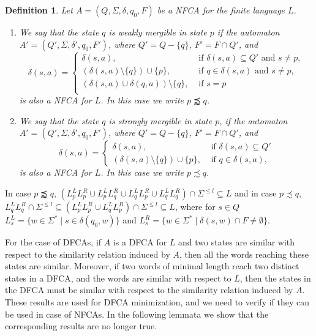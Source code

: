 \documentclass[submission,copyright,creativecommons]{eptcs}
\newtheorem{definition}{Definition}
\begin{document}
\begin{definition}
 Let $A=(Q,\Sigma,\delta,q_0,F)$ be a NFCA for the finite language $L$. 
\begin{enumerate}
 \item We say that the state $q$ is {\em weakly mergible} in state $p$
if the automaton
$A'=(Q',\Sigma,\delta',q_0,F')$, where
$Q'=Q-\{q\}$, $F'=F\cap Q'$, and 
$$
\delta(s,a)=\left\{\begin{array}{ll}
                      \delta(s,a),&\mbox{ if  }\delta(s,a)\subseteq Q'\mbox{ and }s\neq p,\\
                      (\delta(s,a)\setminus\{q\})\cup \{p\},&\mbox{ if  }q\in \delta(s,a)\mbox{ and }s\neq p,\\
                       (\delta(s,a)\cup\delta(q,a))\setminus\{q\},&\mbox{ if  }s=p\\
                     \end{array}
\right.
$$
 is also a NFCA for $L$.
In this case we write $p\precapprox q$.
\item We say that the state $q$ is {\em strongly mergible} in state $p$, 
if the automaton
$A'=(Q',\Sigma,\delta',q_0,F')$, where
$Q'=Q-\{q\}$, $F'=F\cap Q'$, and 
$$
\delta(s,a)=\left\{\begin{array}{ll}
                      \delta(s,a),&\mbox{ if  }\delta(s,a)\subseteq Q'\\
                      (\delta(s,a)\setminus\{q\})\cup \{p\},&\mbox{ if  }q\in \delta(s,a),
                     \end{array}
\right.
$$
 is also a NFCA for $L$.
In this case we write $p\precsim q$.
\end{enumerate}
\end{definition}
In case $p\precapprox q$, 
$(L^L_pL^R_p\cup L^L_pL^R_q\cup L^L_qL^R_p\cup L^L_qL^R_q) \cap \Sigma^{\leq l}\subseteq L$
and in case $p\precsim q$, 
$L^L_qL^R_q\cap \Sigma^{\leq l}\subseteq 
(L^L_pL^R_p\cup L^L_qL^R_p) \cap \Sigma^{\leq l} \subseteq L$, where for $s\in Q$
$L^L_s=\{w\in \Sigma^*\mid s\in \delta(q_0,w)\}$ and
$L^R_s=\{w\in \Sigma^*\mid \delta(s,w)\cap F\neq \emptyset\}$.


For the case of DFCAs, if $A$ is a DFCA for $L$ and two states are similar with respect
 to the similarity relation induced by $A$, then all the words reaching these states are similar.
Moreover, if two words of minimal length reach two distinct states in a DFCA, and the words are similar
with respect to $L$, then the states in the DFCA must be similar with respect to the similarity 
relation induced by $A$. These results are used  for DFCA minimization, and we need to verify 
if they can be used in case of NFCAs. In the following lemmata we show that  
 the corresponding results are no longer true.
\end{document}
